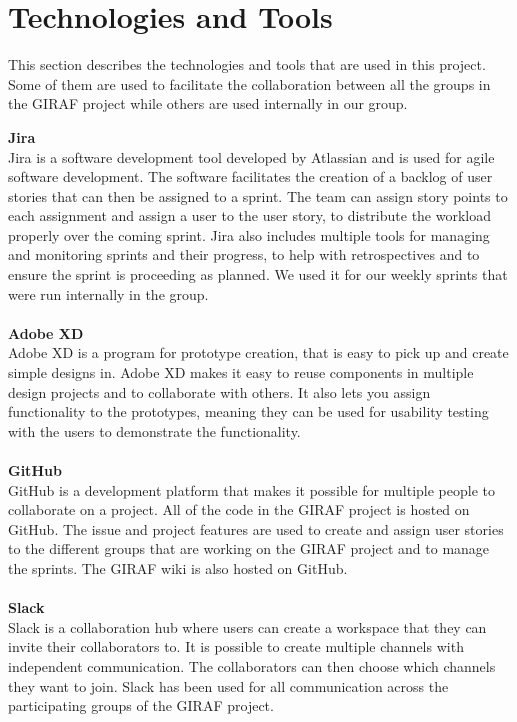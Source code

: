 \section{Technologies and Tools}
This section describes the technologies and tools that are used in this project. 
Some of them are used to facilitate the collaboration between all the groups in the GIRAF project while others are used internally in our group.

\textbf{Jira}\\
Jira is a software development tool developed by Atlassian and is used for agile software development.
The software facilitates the creation of a backlog of user stories that can then be assigned to a sprint.
The team can assign story points to each assignment and assign a user to the user story, to distribute the workload properly over the coming sprint.
Jira also includes multiple tools for managing and monitoring sprints and their progress, to help with retrospectives and to ensure the sprint is proceeding as planned.
We used it for our weekly sprints that were run internally in the group.
\\\\
\textbf{Adobe XD}\\
Adobe XD is a program for prototype creation, that is easy to pick up and create simple designs in.
Adobe XD makes it easy to reuse components in multiple design projects and to collaborate with others.
It also lets you assign functionality to the prototypes, meaning they can be used for usability testing with the users to demonstrate the functionality.
\\\\
\textbf{GitHub}\\
GitHub is a development platform that makes it possible for multiple people to collaborate on a project. 
All of the code in the GIRAF project is hosted on GitHub.
The issue and project features are used to create and assign user stories to the different groups that are working on the GIRAF project and to manage the sprints. 
The GIRAF wiki is also hosted on GitHub.
\\\\
\textbf{Slack}\\
Slack is a collaboration hub where users can create a workspace that they can invite their collaborators to.
It is possible to create multiple channels with independent communication. 
The collaborators can then choose which channels they want to join.
Slack has been used for all communication across the participating groups of the GIRAF project.
